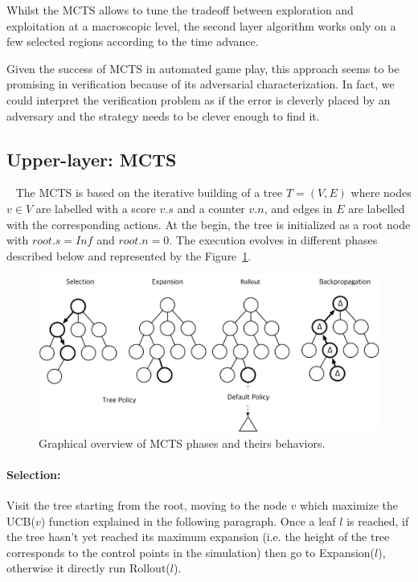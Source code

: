 \documentclass[11pt]{article}
\begin{document}
Whilst the MCTS allows to tune the tradeoff between exploration and exploitation at a macroscopic level, the second layer algorithm works only on a few selected regions according to the time advance.

Given the success of MCTS in automated game play, this approach seems to be promising in verification because of its adversarial characterization. In fact, we could interpret the verification problem as if the error is cleverly placed by an adversary and the strategy needs to be clever enough to find it. 

\subsection{Upper-layer: MCTS}~\label{sec:MCTS}
The MCTS is based on the iterative building of a tree $T=(V,E)$ where nodes $v \in V$ are labelled with a score $v.s$ and a counter $v.n$, and edges in $E$ are labelled with the corresponding actions. At the begin, the tree is initialized as a root node with $root.s=Inf$ and $root.n=0$.
The execution evolves in different phases described below and represented by the Figure~\ref{fig:mcts}.

\begin{figure}[H]
  \includegraphics[width=\linewidth]{img/mcts2.png}
  \caption{Graphical overview of MCTS phases and theirs behaviors.}
  \label{fig:mcts}
\end{figure}

\paragraph{Selection:} Visit the tree starting from the root, moving to the node $v$ which maximize the UCB($v$) function explained in the following paragraph.
Once a leaf $l$ is reached, if the tree hasn't yet reached its maximum expansion (i.e. the height of the tree corresponds to the control points in the simulation) then go to Expansion($l$), otherwise it directly run Rollout($l$).
\end{document}
